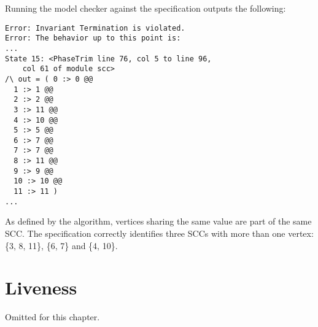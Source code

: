 Running the model checker against the specification outputs the following: 
\begin{verbatim}
Error: Invariant Termination is violated.                               
Error: The behavior up to this point is:      
...
State 15: <PhaseTrim line 76, col 5 to line 96, 
    col 61 of module scc>
/\ out = ( 0 :> 0 @@ 
  1 :> 1 @@  
  2 :> 2 @@ 
  3 :> 11 @@                                                            
  4 :> 10 @@                                                            
  5 :> 5 @@                                                             
  6 :> 7 @@                                                             
  7 :> 7 @@                                                             
  8 :> 11 @@                                                            
  9 :> 9 @@                                                             
  10 :> 10 @@                                                           
  11 :> 11 )   
...
\end{verbatim}

As defined by the algorithm, vertices sharing the same value are part of the
same SCC. The specification correctly identifies three SCCs with more than one vertex:
\{3, 8, 11\}, \{6, 7\} and \{4, 10\}.

\section{Liveness}

Omitted for this chapter.

% 

